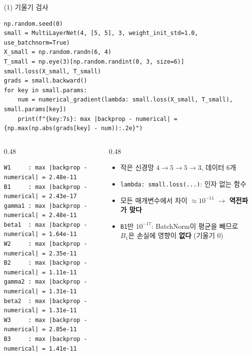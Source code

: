 \documentclass[aspectratio=169,11pt]{beamer}
\newcommand{\codetiny}{\ttfamily\fontsize{6.8}{7.6}\selectfont}
\newcommand{\code}[1]{\texttt{#1}}
\begin{document}
\begin{frame}[fragile]{(1) 기울기 검사}
\begin{lstlisting}
np.random.seed(0)
small = MultiLayerNet(4, [5, 5], 3, weight_init_std=1.0, use_batchnorm=True)
X_small = np.random.randn(6, 4)
T_small = np.eye(3)[np.random.randint(0, 3, size=6)]
small.loss(X_small, T_small)
grads = small.backward()
for key in small.params:
    num = numerical_gradient(lambda: small.loss(X_small, T_small), small.params[key])
    print(f"{key:7s}: max |backprop - numerical| = {np.max(np.abs(grads[key] - num)):.2e}")
\end{lstlisting}
\begin{columns}[T,onlytextwidth]
\begin{column}{0.48\textwidth}
\begin{lstlisting}[style=outstyle,basicstyle=\codetiny]
W1     : max |backprop - numerical| = 2.48e-11
B1     : max |backprop - numerical| = 2.43e-17
gamma1 : max |backprop - numerical| = 2.48e-11
beta1  : max |backprop - numerical| = 1.64e-11
W2     : max |backprop - numerical| = 2.35e-11
B2     : max |backprop - numerical| = 1.11e-11
gamma2 : max |backprop - numerical| = 1.31e-11
beta2  : max |backprop - numerical| = 1.31e-11
W3     : max |backprop - numerical| = 2.85e-11
B3     : max |backprop - numerical| = 1.41e-11
\end{lstlisting}
\end{column}
\begin{column}{0.48\textwidth}
\footnotesize
\begin{itemize}
\item 작은 신경망 $4\to5\to5\to3$, 데이터 6개
\item \code{lambda: small.loss(...)}: 인자 없는 함수
\item 모든 매개변수에서 차이 $\approx10^{-11}$ $\to$ \textbf{역전파가 맞다}
\item \code{B1}만 $10^{-17}$: BatchNorm이 평균을 빼므로 $B_1$은 손실에 영향이 \textbf{없다} (기울기 $0$)
\end{itemize}
\end{column}
\end{columns}
\end{frame}
\end{document}
